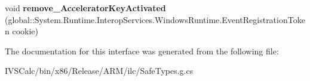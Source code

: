 \begin{DoxyCompactItemize}
\item 
\mbox{\label{interface_windows_1_1_u_i_1_1_core_1_1_i_core_accelerator_keys_a821215fbccaab1a96d172dfa425ebdaf}} 
void {\bfseries remove\+\_\+\+Accelerator\+Key\+Activated} (global\+::\+System.\+Runtime.\+Interop\+Services.\+Windows\+Runtime.\+Event\+Registration\+Token cookie)
\end{DoxyCompactItemize}


The documentation for this interface was generated from the following file\+:\begin{DoxyCompactItemize}
\item 
I\+V\+S\+Calc/bin/x86/\+Release/\+A\+R\+M/ilc/Safe\+Types.\+g.\+cs\end{DoxyCompactItemize}
